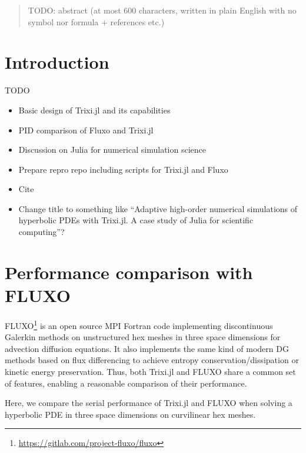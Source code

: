 \documentclass{juliacon}
\begin{document}


\maketitle

\begin{abstract}
TODO: abstract (at most 600 characters, written in plain English with no symbol
nor formula + references etc.) %
\end{abstract}


\section{Introduction}

TODO %
\begin{itemize}
  \item Basic design of Trixi.jl and its capabilities
  \item PID comparison of Fluxo and Trixi.jl
  \item Discussion on Julia for numerical simulation science
  \item Prepare repro repo including scripts for Trixi.jl and Fluxo
  \item Cite \cite{bezanson2017julia,schlottkelakemper2021purely,rackauckas2017differentialequations,revels2016forward}
  \item Change title to something like ``Adaptive high-order numerical simulations
  of hyperbolic PDEs with Trixi.jl. A case study of Julia for scientific computing''?
\end{itemize}


\section{Performance comparison with FLUXO}

FLUXO\footnote{\url{https://gitlab.com/project-fluxo/fluxo}} is an open source
MPI Fortran code implementing discontinuous Galerkin methods on unstructured hex
meshes in three space dimensions for advection diffusion equations. It also
implements the same kind of modern DG methods based on flux differencing
to achieve entropy conservation/dissipation or kinetic energy preservation.
Thus, both Trixi.jl and FLUXO share a common set of features, enabling a reasonable
comparison of their performance.

Here, we compare the serial performance of Trixi.jl and FLUXO when solving a
hyperbolic PDE in three space dimensions on curvilinear hex meshes.
\end{document}
